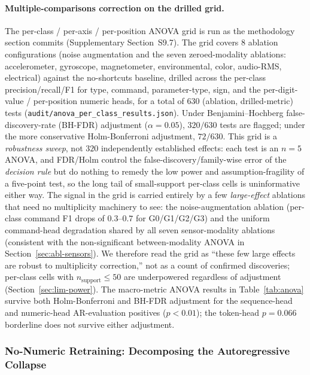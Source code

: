 \documentclass[sensors,article,submit,moreauthors,pdftex]{Definitions/mdpi}
\begin{document}
\paragraph{Multiple-comparisons correction on the drilled grid.} The per-class / per-axis / per-position ANOVA grid is run as the methodology section commits (Supplementary Section~S9.7). The grid covers 8 ablation configurations (noise augmentation and the seven zeroed-modality ablations: accelerometer, gyroscope, magnetometer, environmental, color, audio-RMS, electrical) against the no-shortcuts baseline, drilled across the per-class precision/recall/F1 for type, command, parameter-type, sign, and the per-digit-value / per-position numeric heads, for a total of $630$ (ablation, drilled-metric) tests (\texttt{audit/anova\_per\_class\_results.json}). Under Benjamini--Hochberg false-discovery-rate (BH-FDR) adjustment ($\alpha=0.05$), $320 / 630$ tests are flagged; under the more conservative Holm-Bonferroni adjustment, $72 / 630$. This grid is a \emph{robustness sweep}, not $320$ independently established effects: each test is an $n=5$ ANOVA, and FDR/Holm control the false-discovery/family-wise error of the \emph{decision rule} but do nothing to remedy the low power and assumption-fragility of a five-point test, so the long tail of small-support per-class cells is uninformative either way. The signal in the grid is carried entirely by a few \emph{large-effect} ablations that need no multiplicity machinery to see: the noise-augmentation ablation (per-class command F1 drops of $0.3$--$0.7$ for G0/G1/G2/G3) and the uniform command-head degradation shared by all seven sensor-modality ablations (consistent with the non-significant between-modality ANOVA in Section~\ref{sec:abl-sensors}). We therefore read the grid as ``these few large effects are robust to multiplicity correction,'' not as a count of confirmed discoveries; per-class cells with $n_{\text{support}}\le 50$ are underpowered regardless of adjustment (Section~\ref{sec:lim-power}). The macro-metric ANOVA results in Table~\ref{tab:anova} survive both Holm-Bonferroni and BH-FDR adjustment for the sequence-head and numeric-head AR-evaluation positives ($p < 0.01$); the token-head $p=0.066$ borderline does not survive either adjustment.




\subsubsection{No-Numeric Retraining: Decomposing the Autoregressive Collapse}
\label{sec:abl-nonumeric}
\end{document}
